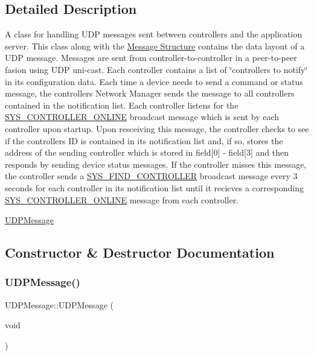 \subsection{Detailed Description}
A class for handling U\+DP messages sent between controllers and the application server. This class along with the \hyperlink{struct_u_d_p_message_struct}{Message Structure} contains the data layout of a U\+DP message. Messages are sent from controller-\/to-\/controller in a peer-\/to-\/peer fasion using U\+DP uni-\/cast. Each controller contains a list of \char`\"{}controllers to notify\char`\"{} in its configuration data. Each time a device needs to send a command or status message, the controller\textquotesingle{}s Network Manager sends the message to all controllers contained in the notification list. Each controller listens for the \hyperlink{group___u_d_p_message_i_d_ga23aab89076591390a1dbc412a3a07314}{S\+Y\+S\+\_\+\+C\+O\+N\+T\+R\+O\+L\+L\+E\+R\+\_\+\+O\+N\+L\+I\+NE} broadcast message which is sent by each controller upon startup. Upon resceiving this message, the controller checks to see if the controller\textquotesingle{}s ID is contained in its notification list and, if so, stores the address of the sending controller which is stored in field\mbox{[}0\mbox{]} -\/ field\mbox{[}3\mbox{]} and then responds by sending device status messages. If the controller misses this message, the controller sends a \hyperlink{group___u_d_p_message_i_d_gadfda0e5a5a6a08de555dd55182a4cd87}{S\+Y\+S\+\_\+\+F\+I\+N\+D\+\_\+\+C\+O\+N\+T\+R\+O\+L\+L\+ER} broadcast message every 3 seconds for each controller in its notification list until it recieves a corresponding \hyperlink{group___u_d_p_message_i_d_ga23aab89076591390a1dbc412a3a07314}{S\+Y\+S\+\_\+\+C\+O\+N\+T\+R\+O\+L\+L\+E\+R\+\_\+\+O\+N\+L\+I\+NE} message from each controller. 

\hyperlink{class_u_d_p_message}{U\+D\+P\+Message} 

\subsection{Constructor \& Destructor Documentation}
\mbox{\label{class_u_d_p_message_a823351519fc5818ccc03030c6947e620}} 
\subsubsection{\texorpdfstring{U\+D\+P\+Message()}{UDPMessage()}\hspace{0.1cm}{\footnotesize\ttfamily [1/3]}}
{\footnotesize\ttfamily U\+D\+P\+Message\+::\+U\+D\+P\+Message (\begin{DoxyParamCaption}\item[{void}]{ }\end{DoxyParamCaption})}

